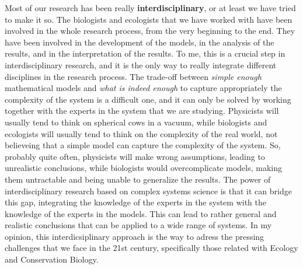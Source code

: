 Most of our research has been really \textbf{interdisciplinary}, or at least
we have tried to make it so. The biologists and ecologists that we have worked
with have been involved in the whole research process, from the very beginning
to the end. They have been involved in the development of the models, in the
analysis of the results, and in the interpretation of the results. To me, this
is a crucial step in interdisciplinary research, and it is the only way to
really integrate different disciplines in the research process. The trade-off
between \textit{simple enough} mathematical models and \textit{what is indeed
    enough} to capture appropriately the complexity of the system is a
difficult one, and it can only be solved by working together with the experts
in the system that we are studying. Physicists will usually tend to think on
spherical cows in a vacuum, while biologists and ecologists will usually tend
to think on the complexity of the real world, not believeing that a simple
model can capture the complexity of the system. So, probably quite often,
physicists will make wrong assumptions, leading to unrealistic conclusions,
while biologists would overcomplicate models, making them untractable and being
unable to generalize the results. The power of interdisciplinary research based
on complex systems science is that it can bridge this gap, integrating the
knowledge of the experts in the system with the knowledge of the experts in the
models. This can lead to rather general and realistic conclusions that can be
applied to a wide range of systems. In my opinion, this interdicsiplinary
approach is the way to adress the pressing challenges that we face in the 21st
century, specifically those related with Ecology and Conservation Biology.


